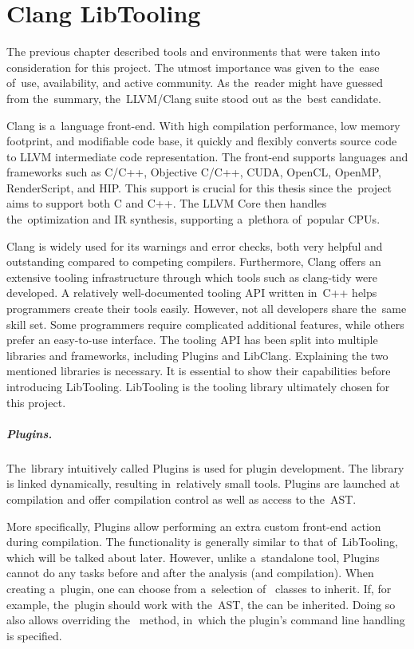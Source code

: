 \chapter{Clang LibTooling}\label{chap:libtooling}

The previous chapter described tools and environments that were taken
into consideration for this project. 
The utmost importance was given to the~ease of~use, availability, and 
active community. 
As the~reader might have guessed from the~summary, the~LLVM/Clang 
suite stood out as the~best candidate.

Clang is a~language front-end. With high compilation performance, 
low memory footprint, and modifiable code base, it quickly and flexibly 
converts source code to LLVM intermediate code representation. 
The front-end supports languages and frameworks such as C/C++, 
Objective C/C++, CUDA, OpenCL, OpenMP, RenderScript, and HIP. 
This support is crucial for this thesis since the~project 
aims to support both C and C++. 
The LLVM Core then handles the~optimization and IR synthesis, 
supporting a~plethora of~popular CPUs.

Clang is widely used for its warnings and error checks, both very 
helpful and outstanding compared to competing compilers. 
Furthermore, Clang offers an extensive tooling infrastructure 
through which tools such as clang-tidy were developed. 
A relatively well-documented tooling API written in~C++ helps 
programmers create their tools easily. 
However, not all developers share the~same skill set. 
Some programmers require complicated additional features, while others 
prefer an easy-to-use interface. 
The tooling API has been split into multiple libraries and frameworks,
including Plugins and LibClang.
Explaining the two mentioned libraries is necessary. 
It is essential to show their capabilities before introducing LibTooling. 
LibTooling is the tooling library ultimately chosen for this project.

\paragraph{Plugins.}

The~library intuitively called Plugins is used for plugin development.
The library is linked dynamically, resulting in~relatively small tools.
Plugins are launched at compilation and offer compilation control as well 
as access to the~AST.

More specifically, Plugins allow performing an extra custom front-end action 
during compilation.
The functionality is generally similar to that of~LibTooling, which will be 
talked about later.
However, unlike a~standalone tool, Plugins cannot do any tasks before and after 
the analysis (and compilation).
When creating a~plugin, one can choose from a~selection of~
 classes to inherit.
If, for example, the~plugin should work with the~AST, 
the  can be inherited.
Doing so also allows overriding the~ method, in~which 
the plugin's command line handling is specified.

